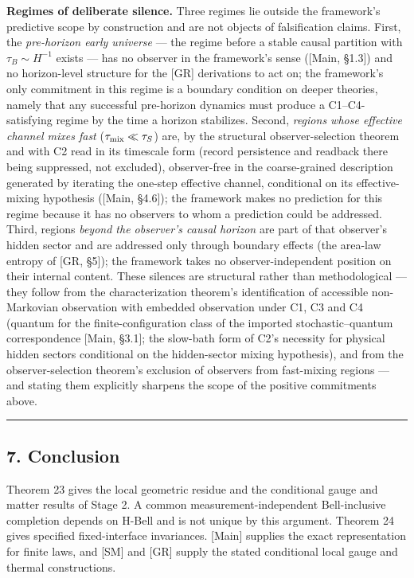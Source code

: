 \documentclass[
]{article}
\begin{document}
\textbf{Regimes of deliberate silence.} Three regimes lie outside the
framework's predictive scope by construction and are not objects of
falsification claims. First, the \emph{pre-horizon early universe} ---
the regime before a stable causal partition with \(\tau_B \sim H^{-1}\)
exists --- has no observer in the framework's sense ({[}Main, §1.3{]})
and no horizon-level structure for the {[}GR{]} derivations to act on;
the framework's only commitment in this regime is a boundary condition
on deeper theories, namely that any successful pre-horizon dynamics must
produce a C1--C4-satisfying regime by the time a horizon stabilizes.
Second, \emph{regions whose effective channel mixes fast}
(\(\tau_{\rm mix} \ll \tau_S\)) are, by the structural
observer-selection theorem and with C2 read in its timescale form
(record persistence and readback there being suppressed, not excluded),
observer-free in the coarse-grained description generated by iterating
the one-step effective channel, conditional on its effective-mixing
hypothesis ({[}Main, §4.6{]}); the framework makes no prediction for
this regime because it has no observers to whom a prediction could be
addressed. Third, regions \emph{beyond the observer's causal horizon}
are part of that observer's hidden sector and are addressed only through
boundary effects (the area-law entropy of {[}GR, §5{]}); the framework
takes no observer-independent position on their internal content. These
silences are structural rather than methodological --- they follow from
the characterization theorem's identification of accessible
non-Markovian observation with embedded observation under C1, C3 and C4
(quantum for the finite-configuration class of the imported
stochastic--quantum correspondence {[}Main, §3.1{]}; the slow-bath form
of C2's necessity for physical hidden sectors conditional on the
hidden-sector mixing hypothesis), and from the observer-selection
theorem's exclusion of observers from fast-mixing regions --- and
stating them explicitly sharpens the scope of the positive commitments
above.

\begin{center}\rule{0.5\linewidth}{0.5pt}\end{center}

\hypertarget{conclusion}{%
\subsection{7. Conclusion}\label{conclusion}}

Theorem 23 gives the local geometric residue and the conditional gauge
and matter results of Stage 2. A common measurement-independent
Bell-inclusive completion depends on H-Bell and is not unique by this
argument. Theorem 24 gives specified fixed-interface invariances.
{[}Main{]} supplies the exact representation for finite laws, and
{[}SM{]} and {[}GR{]} supply the stated conditional local gauge and
thermal constructions.
\end{document}

